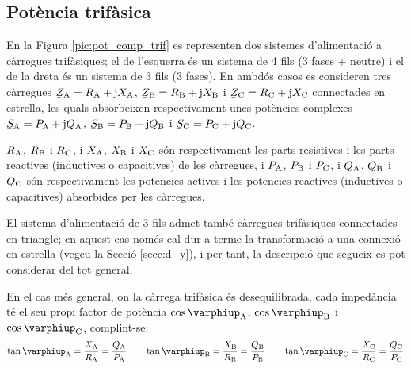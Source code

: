 \subsection{Potència trifàsica}  \label{sec:pot-trif}

En la Figura \vref{pic:pot_comp_trif} es representen dos sistemes
d'alimentació a càrregues trifàsiques; el de l'esquerra és un
sistema de 4 fils (3 fases + neutre) i el de la dreta és un sistema
de 3 fils (3 fases). En ambdós casos es consideren tres càrregues
$\cmplx{Z}\ped{A} = R\ped{A} + \ju X\ped{A}$, $\cmplx{Z}\ped{B}=
R\ped{B} + \ju X\ped{B}$ i $\cmplx{Z}\ped{C}= R\ped{C} + \ju X\ped{C}$
connectades en estrella, les quals absorbeixen respectivament unes
potències complexes $\cmplx{S}\ped{A} = P\ped{A} + \ju Q\ped{A}$,
$\cmplx{S}\ped{B}= P\ped{B} + \ju Q\ped{B}$ i $\cmplx{S}\ped{C}=
P\ped{C} + \ju Q\ped{C}$.

$R_\mathrm{A}$, $R_\mathrm{B}$ i $R_\mathrm{C}$, i $X_\mathrm{A}$, $X_\mathrm{B}$ i
$X_\mathrm{C}$ són respectivament les parts resistives i les parts
reactives (inductives o capacitives) de les càrregues, i $P_\mathrm{A}$,
$P_\mathrm{B}$ i $P_\mathrm{C}$, i $Q_\mathrm{A}$, $Q_\mathrm{B}$ i $Q_\mathrm{C}$ són
respectivament les potencies actives i les potencies reactives
(inductives o capacitives) absorbides per les càrregues.

El sistema d'alimentació de 3 fils admet també càrregues
trifàsiques connectades en triangle; en aquest cas només cal dur a
terme la transformació a una connexió en estrella (vegeu la Secció
\ref{secc:d_y}), i per tant, la descripció que segueix es pot
considerar del tot general.

\begin{center}
    
    \label{pic:pot_comp_trif}
\end{center}

En el cas més general, on la càrrega trifàsica és desequilibrada,
cada impedància té el seu propi factor de potència
$\cos\varphiup\ped{A}$, $\cos\varphiup\ped{B}$ i $\cos\varphiup\ped{C}$,
complint-se:
\begin{equation}
    \tan\varphiup\ped{A} = \frac{X\ped{A}}{R\ped{A}} = \frac{Q\ped{A}}{P\ped{A}} \qquad
    \tan\varphiup\ped{B} = \frac{X\ped{B}}{R\ped{B}} = \frac{Q\ped{B}}{P\ped{B}} \qquad
    \tan\varphiup\ped{C} = \frac{X\ped{C}}{R\ped{C}} = \frac{Q\ped{C}}{P\ped{C}}
\end{equation}

